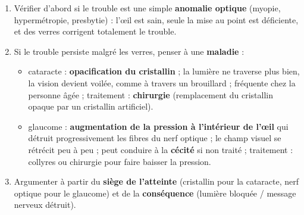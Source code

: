 \documentclass[11pt]{article}
\newcommand{\cle}[1]{{\popxbold\color{popdark}#1}}
\begin{document}
\begin{methode}
\begin{enumerate}
\item Vérifier d'abord si le trouble est une simple \textbf{anomalie optique} (myopie, hypermétropie, presbytie) : l'œil est sain, seule la mise au point est déficiente, et des verres corrigent totalement le trouble.
\item Si le trouble persiste malgré les verres, penser à une \textbf{maladie} :
\begin{itemize}
\item \cle{cataracte} : \textbf{opacification du cristallin} ; la lumière ne traverse plus bien, la vision devient voilée, comme à travers un brouillard ; fréquente chez la personne âgée ; traitement : \textbf{chirurgie} (remplacement du cristallin opaque par un cristallin artificiel).
\item \cle{glaucome} : \textbf{augmentation de la pression à l'intérieur de l'œil} qui détruit progressivement les fibres du nerf optique ; le champ visuel se rétrécit peu à peu ; peut conduire à la \textbf{cécité} si non traité ; traitement : collyres ou chirurgie pour faire baisser la pression.
\end{itemize}
\item Argumenter à partir du \textbf{siège de l'atteinte} (cristallin pour la cataracte, nerf optique pour le glaucome) et de la \textbf{conséquence} (lumière bloquée / message nerveux détruit).
\end{enumerate}
\end{methode}
\end{document}
